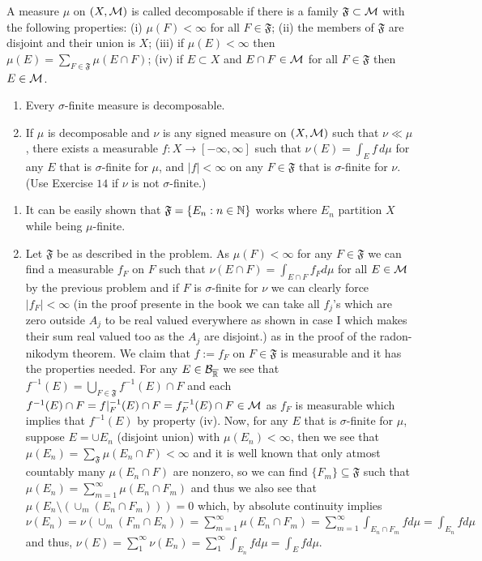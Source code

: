 \documentclass[12pt,a4paper]{article}
\begin{document}
\begin{problem}\label{prob:3-15}
A measure $\mu$ on $(X, \mathcal{M})$ is called decomposable if there is a family $\mathfrak{F}\subset\mathcal{M}$ with the following properties: (i) $\mu(F)<\infty$ for all $F\in\mathfrak{F}$; (ii) the members of $\mathfrak{F}$ are disjoint and their union is $X$; (iii) if $\mu(E)<\infty$ then $\mu(E)=\sum_{F\in\mathfrak{F}}\mu(E\cap F)$; (iv) if $E\subset X$ and $E\cap F\in\mathcal{M}$ for all $F\in\mathfrak{F}$ then $E\in\mathcal{M}$.
\begin{enumerate}[label=\alph*.]
    \item Every $\sigma$-finite measure is decomposable.
    \item If $\mu$ is decomposable and $\nu$ is any signed measure on $(X, \mathcal{M})$ such that $\nu\ll\mu$, there exists a measurable $f:X\rightarrow[-\infty,\infty]$ such that $\nu(E)=\int_{E}f\,d\mu$ for any $E$ that is $\sigma$-finite for $\mu$, and $|f|<\infty$ on any $F\in\mathfrak{F}$ that is $\sigma$-finite for $\nu$. (Use Exercise $14$ if $\nu$ is not $\sigma$-finite.) 
\end{enumerate}
\end{problem}
\begin{solution}
\begin{enumerate}[label=\alph*.]
	\item It can be easily shown that $\mathfrak F=\{E_n:n\in\mathbb{N}\}$ works where $E_n$ partition $X$ while being $\mu$-finite.
	\item Let $\mathfrak F$ be as described in the problem. 
	As $\mu(F)<\infty$ for any $F\in\mathfrak F$ we can find a measurable $f_F$ on  $F$ such that $\nu(E\cap F)=\int_{E\cap F}f_Fd\mu$ for all $E\in\mathcal{M}$ by the previous problem and if $F$ is $\sigma$-finite for $\nu$ we can clearly force $|f_F|<\infty$ (in the proof presente in the book we can take all $f_j$'s which are zero outside $A_j$ to be real valued everywhere as shown in case I which makes their sum real valued too as the $A_j$ are disjoint.) as in the proof of the radon-nikodym theorem. 
	We claim that $f:=f_F$ on $F\in\mathfrak F$ is measurable and it has the properties needed. 
	For any $E\in\mathcal B_{\overline{\mathbb{R}}}$ we see that $f^{-1}(E)=\bigcup_{F\in\mathfrak F}f^{-1}(E)\cap F$ and each $f^{-1}(E)\cap F=f|_{F}^{-1}(E)\cap F=f_F^{-1}(E)\cap F\in\mathcal{M}$ as $f_F$ is measurable which implies that $f^{-1}(E)$ by property (iv). 
	Now, for any $E$ that is $\sigma$-finite for $\mu$, suppose $E=\cup E_n$ (disjoint union) with $\mu(E_n)<\infty$, then we see that $\mu(E_n)=\sum_{\mathfrak F}\mu(E_n\cap F)<\infty$ and it is well known that only atmost countably many $\mu(E_n\cap F)$ are nonzero, so we can find $\{F_m\}\subseteq\mathfrak F$ such that $\mu(E_n)=\sum_{m=1}^\infty\mu(E_n\cap F_m)$ and thus we also see that $\mu(E_n\setminus(\cup_m(E_n\cap F_m)))=0$ which, by absolute continuity implies $\nu(E_n)=\nu(\cup_m(F_m\cap E_n))=\sum_{m=1}^\infty\mu(E_n\cap F_m)=\sum_{m=1}^\infty\int_{E_n\cap F_m}fd\mu=\int_{E_n}fd\mu$ and thus, $\nu(E)=\sum_1^\infty\nu(E_n)=\sum_1^\infty\int_{E_n}fd\mu=\int_Efd\mu$. 
\end{enumerate}
\end{solution}
\end{document}
